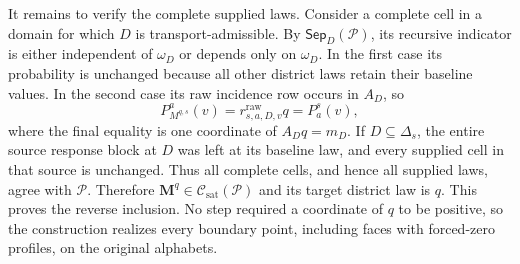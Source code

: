 It remains to verify the complete supplied laws. Consider a complete cell in a domain for which \(D\) is transport-admissible. By \(\mathsf{Sep}_D(\mathcal P)\), its recursive indicator is either independent of \(\omega_D\) or depends only on \(\omega_D\). In the first case its probability is unchanged because all other district laws retain their baseline values. In the second case its raw incidence row occurs in \(A_D\), so
\[
P_{M^{q,s}}^a(v)=r^{\mathrm{raw}}_{s,a,D,v}q=P_a^s(v),
\]
where the final equality is one coordinate of \(A_Dq=m_D\). If \(D\subseteq\Delta_s\), the entire source response block at \(D\) was left at its baseline law, and every supplied cell in that source is unchanged. Thus all complete cells, and hence all supplied laws, agree with \(\mathcal P\). Therefore \(\mathbf M^q\in\mathcal C_{\mathrm{sat}}(\mathcal P)\) and its target district law is \(q\). This proves the reverse inclusion. No step required a coordinate of \(q\) to be positive, so the construction realizes every boundary point, including faces with forced-zero profiles, on the original alphabets.